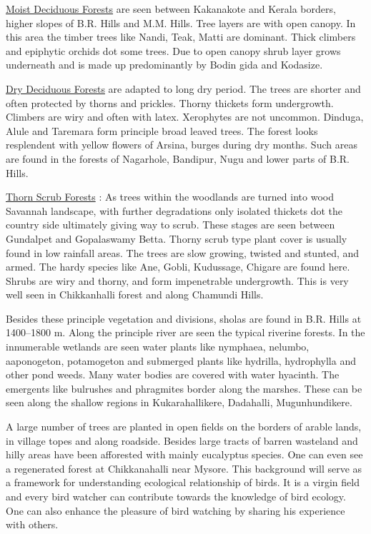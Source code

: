 \underline{Moist Deciduous Forests} are seen between Kakanakote and
Kerala borders, higher slopes of B.R. Hills and M.M. Hills. Tree 
layers are with open canopy. In this area the timber trees like 
Nandi, Teak, Matti are dominant. Thick climbers and epiphytic 
orchids dot some trees. Due to open canopy shrub layer grows 
underneath and is made up predominantly by Bodin gida and Kodasize. 

\underline{Dry Deciduous Forests} are adapted to long dry period. The 
trees are shorter and often protected by thorns and prickles. 
Thorny thickets form undergrowth. Climbers are wiry and often 
with latex. Xerophytes are not uncommon. Dinduga, Alule and 
Taremara form principle broad leaved trees. The forest looks 
resplendent with yellow flowers of Arsina, burges during dry 
months. Such areas are found in the forests of Nagarhole, Bandipur, 
Nugu and lower parts of B.R. Hills. 

\underline{Thorn Scrub Forests} : As trees within the woodlands are turned 
into wood Savannah landscape, with further degradations only isolated 
thickets dot the country side ultimately giving way to 
scrub. These stages are seen between Gundalpet and Gopalaswamy 
Betta. Thorny scrub type plant cover is usually found in low 
rainfall areas. The trees are slow growing, twisted and stunted, 
and armed. The hardy species like Ane, Gobli, Kudussage, Chigare 
are found here. Shrubs are wiry and thorny, and form impenetrable 
undergrowth. This is very well seen in Chikkanhalli forest and 
along Chamundi Hills. 

Besides these principle vegetation and divisions, sholas are 
found in B.R. Hills at 1400--1800 m. Along the principle river 
are seen the typical riverine forests. In the innumerable wetlands 
are seen water plants like nymphaea, nelumbo, aaponogeton, 
potamogeton and submerged plants like hydrilla, hydrophylla and 
other pond weeds. Many water bodies are covered with water hyacinth. 
The emergents like bulrushes and phragmites border along 
the marshes. These can be seen along the shallow regions in 
Kukarahallikere, Dadahalli, Mugunhundikere. 

A large number of trees are planted in open fields on the 
borders of arable lands, in village topes and along roadside. Besides 
large tracts of barren wasteland and hilly areas have been 
afforested with mainly eucalyptus species. One can even see a 
regenerated forest at Chikkanahalli near Mysore. This background 
will serve as a framework for understanding ecological relationship 
of birds. It is a virgin field and every bird watcher can 
contribute towards the knowledge of bird ecology. One can also 
enhance the pleasure of bird watching by sharing his experience 
with others. 


